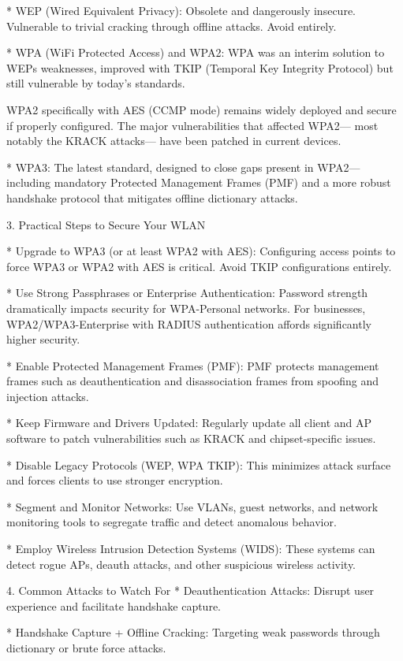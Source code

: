 * WEP (Wired Equivalent Privacy):
Obsolete and dangerously insecure. Vulnerable to trivial cracking through offline attacks. Avoid entirely.

* WPA (WiFi Protected Access) and WPA2:
WPA was an interim solution to WEPs weaknesses, improved with TKIP (Temporal Key Integrity Protocol) but still vulnerable by today's standards.

WPA2 specifically with AES (CCMP mode) remains widely deployed and secure if properly configured. The major vulnerabilities that affected WPA2— most notably the KRACK attacks— have been patched in current devices.

* WPA3:
The latest standard, designed to close gaps present in WPA2—including mandatory Protected Management Frames (PMF) and a more robust handshake protocol that mitigates offline dictionary attacks.

3. Practical Steps to Secure Your WLAN

* Upgrade to WPA3 (or at least WPA2 with AES):
Configuring access points to force WPA3 or WPA2 with AES is critical. Avoid TKIP configurations entirely.

* Use Strong Passphrases or Enterprise Authentication:
Password strength dramatically impacts security for WPA-Personal networks. For businesses, WPA2/WPA3-Enterprise with RADIUS authentication affords significantly higher security.

* Enable Protected Management Frames (PMF):
PMF protects management frames such as deauthentication and disassociation frames from spoofing and injection attacks.

* Keep Firmware and Drivers Updated:
Regularly update all client and AP software to patch vulnerabilities such as KRACK and chipset-specific issues.

* Disable Legacy Protocols (WEP, WPA TKIP):
This minimizes attack surface and forces clients to use stronger encryption.

* Segment and Monitor Networks:
Use VLANs, guest networks, and network monitoring tools to segregate traffic and detect anomalous behavior.

* Employ Wireless Intrusion Detection Systems (WIDS):
These systems can detect rogue APs, deauth attacks, and other suspicious wireless activity.

4. Common Attacks to Watch For
* Deauthentication Attacks:
Disrupt user experience and facilitate handshake capture.

* Handshake Capture + Offline Cracking:
Targeting weak passwords through dictionary or brute force attacks.

